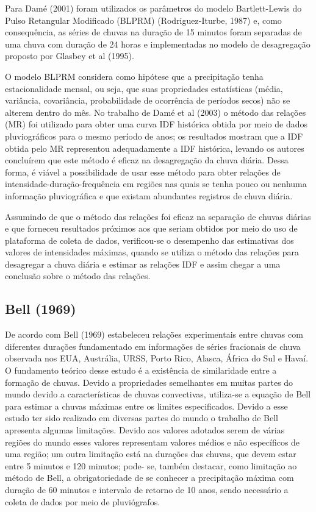 Para Damé (2001) foram utilizados os parâmetros do modelo Bartlett-Lewis do Pulso Retangular Modificado (BLPRM) (Rodriguez-Iturbe, 1987) e, como consequência, as séries de chuvas na duração de 15 minutos foram separadas de uma chuva com duração de 24 horas e implementadas no modelo de desagregação proposto por Glasbey et al (1995).

O modelo BLPRM considera como hipótese que a precipitação tenha estacionalidade mensal, ou seja, que suas propriedades estatísticas (média, variância, covariância, probabilidade de ocorrência de períodos secos) não se alterem dentro do mês. No trabalho de Damé et al (2003) o método das relações (MR) foi utilizado para obter uma curva IDF histórica obtida por meio de dados pluviográficos para o mesmo período de anos; os resultados mostram que a IDF obtida pelo MR representou adequadamente a IDF histórica, levando os autores concluírem que este método é eficaz na desagregação da chuva diária. Dessa forma, é viável a possibilidade de usar esse método para obter relações de intensidade-duração-frequência em regiões nas quais se tenha pouco ou nenhuma informação pluviográfica e que existam abundantes registros de chuva diária.

Assumindo de que o método das relações foi eficaz na separação de chuvas diárias e que forneceu resultados próximos aos que seriam obtidos por meio do uso de plataforma de coleta de dados, verificou-se o desempenho das estimativas dos valores de intensidades máximas, quando se utiliza o método das relações para desagregar a chuva diária e estimar as relações IDF e assim chegar a uma conclusão sobre o método das relações.

\subsection{Bell (1969)}

De acordo com Bell (1969) estabeleceu relações experimentais entre chuvas com diferentes durações fundamentado em informações de séries fracionais de chuva observada nos EUA, Austrália, URSS, Porto Rico, Alasca, África do Sul e Havaí. O fundamento teórico desse estudo é a existência de similaridade entre a formação de chuvas. Devido a propriedades semelhantes em muitas partes do mundo devido a características de chuvas convectivas,  utiliza-se a equação de Bell para estimar a chuvas máximas entre os limites especificados. Devido a esse estudo ter sido realizado em diversas partes do mundo o trabalho de Bell apresenta algumas limitações. Devido aos valores adotados serem de várias regiões do mundo esses valores representam valores médios e não específicos de uma região; um outra limitação está na durações das chuvas, que devem estar entre 5 minutos e 120 minutos; pode- se, também destacar, como limitação ao método de Bell, a obrigatoriedade de se conhecer a precipitação máxima com duração de 60 minutos e intervalo de retorno de 10 anos, sendo necessário a coleta de dados por meio de pluviógrafos.

